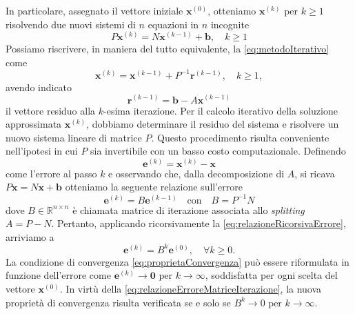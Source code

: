 In particolare, assegnato il vettore iniziale $\bm{x}^{(0)}$, otteniamo $\bm{x}^{(k)}$ per $k\ge1$ risolvendo due nuovi sistemi di $n$ equazioni in $n$ 
incognite
\begin{equation}
    \label{eq:metodoIterativo}
    P\bm{x}^{(k)}=N\bm{x}^{(k-1)} + \bm{b},\quad k\ge1
\end{equation}
Possiamo riscrivere, in maniera del tutto equivalente, la \eqref{eq:metodoIterativo} come
\begin{equation}
    \bm{x}^{(k)}=\bm{x}^{(k-1)} + P^{-1}\bm{r}^{(k-1)},\quad k\ge1,
\end{equation}
avendo indicato
\[
    \bm{r}^{(k-1)}=\bm{b}-A\bm{x}^{(k-1)}
\]
il vettore residuo alla $k$-esima iterazione.\newline
Per il calcolo iterativo della soluzione approssimata  $\bm{x}^{(k)}$, dobbiamo determinare il residuo del sistema e risolvere un nuovo sistema lineare di 
matrice $P$.\newline
Questo procedimento risulta conveniente nell'ipotesi in cui $P$ sia invertibile con un basso costo computazionale.\newline
Definendo
\begin{equation}
    \bm{e}^{(k)} = \bm{x}^{(k)}-\bm{x}
\end{equation}
come l'errore al passo $k$ e osservando che, dalla decomposizione di $A$, si ricava $P\bm{x}= N\bm{x}+\bm{b}$ otteniamo la seguente relazione sull'errore
\begin{equation}
    \label{eq:relazioneRicorsivaErrore}
    \bm{e}^{(k)} = B\bm{e}^{(k-1)} \quad \text{con} \quad B = P^{-1}N
\end{equation}
dove $B\in\mathbb{R}^{n \times n}$ \`e chiamata matrice di iterazione associata allo \textit{splitting} $A = P - N$.
Pertanto, applicando ricorsivamente la \eqref{eq:relazioneRicorsivaErrore}, arriviamo a
\begin{equation}
    \label{eq:relazioneErroreMatriceIterazione}
    \bm{e}^{(k)}=B^{k}\bm{e}^{(0)},\quad\forall{k}\ge0.
\end{equation}
La condizione di convergenza \eqref{eq:proprietaConvergenza} pu\`o essere riformulata in funzione dell'errore come 
$\bm{e}^{(k)} \rightarrow \bm{0} \text{ per } k\rightarrow{\infty}$, soddisfatta per ogni scelta del vettore $\bm{x}^{(0)}$.\newline
In virt\`u della \eqref{eq:relazioneErroreMatriceIterazione}, la nuova propriet\`a di convergenza risulta verificata se e solo se ${B}^{k} \rightarrow 0 \text{ per } k\rightarrow{\infty}$.

